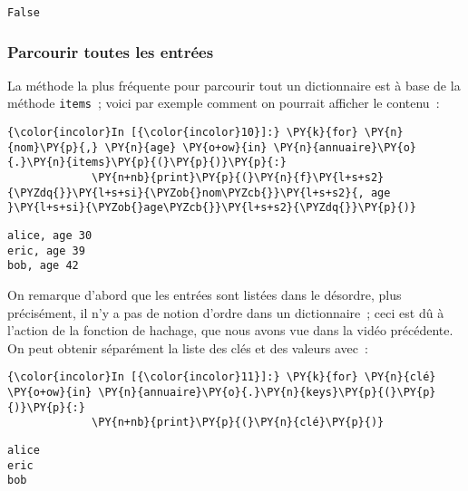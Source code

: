     \begin{Verbatim}[commandchars=\\\{\}]
False

    \end{Verbatim}

    \hypertarget{parcourir-toutes-les-entruxe9es}{%
\subsubsection{Parcourir toutes les
entrées}\label{parcourir-toutes-les-entruxe9es}}

    La méthode la plus fréquente pour parcourir tout un dictionnaire est à
base de la méthode \texttt{items}~; voici par exemple comment on
pourrait afficher le contenu~:

    \begin{Verbatim}[commandchars=\\\{\}]
{\color{incolor}In [{\color{incolor}10}]:} \PY{k}{for} \PY{n}{nom}\PY{p}{,} \PY{n}{age} \PY{o+ow}{in} \PY{n}{annuaire}\PY{o}{.}\PY{n}{items}\PY{p}{(}\PY{p}{)}\PY{p}{:}
             \PY{n+nb}{print}\PY{p}{(}\PY{n}{f}\PY{l+s+s2}{\PYZdq{}}\PY{l+s+si}{\PYZob{}nom\PYZcb{}}\PY{l+s+s2}{, age }\PY{l+s+si}{\PYZob{}age\PYZcb{}}\PY{l+s+s2}{\PYZdq{}}\PY{p}{)}
\end{Verbatim}


    \begin{Verbatim}[commandchars=\\\{\}]
alice, age 30
eric, age 39
bob, age 42

    \end{Verbatim}

    On remarque d'abord que les entrées sont listées dans le désordre, plus
précisément, il n'y a pas de notion d'ordre dans un dictionnaire~; ceci
est dû à l'action de la fonction de hachage, que nous avons vue dans la
vidéo précédente.\\

    On peut obtenir séparément la liste des clés et des valeurs avec~:

    \begin{Verbatim}[commandchars=\\\{\}]
{\color{incolor}In [{\color{incolor}11}]:} \PY{k}{for} \PY{n}{clé} \PY{o+ow}{in} \PY{n}{annuaire}\PY{o}{.}\PY{n}{keys}\PY{p}{(}\PY{p}{)}\PY{p}{:}
             \PY{n+nb}{print}\PY{p}{(}\PY{n}{clé}\PY{p}{)}
\end{Verbatim}


    \begin{Verbatim}[commandchars=\\\{\}]
alice
eric
bob

    \end{Verbatim}

